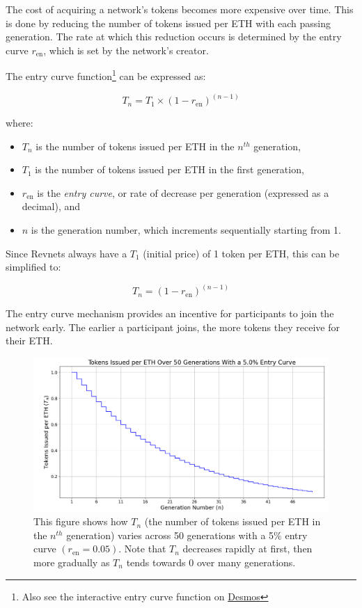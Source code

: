 \documentclass{article}
\begin{document}
The cost of acquiring a network's tokens becomes more expensive over time. This is done by reducing the number of tokens issued per ETH with each passing generation. The rate at which this reduction occurs is determined by the entry curve $r_{\text{en}}$, which is set by the network's creator.

The entry curve function\footnote{Also see the interactive entry curve function on \href{https://www.desmos.com/calculator/ey9fhuslwe}{Desmos}} can be expressed as:

\begin{equation}
  T_n = T_1 \times (1 - r_{\text{en}})^{(n - 1)}
\end{equation}

where:
\begin{itemize}
  \item $T_n$ is the number of tokens issued per ETH in the $n^{th}$ generation,
  \item $T_1$ is the number of tokens issued per ETH in the first generation,
  \item $r_{\text{en}}$ is the \textit{entry curve}, or rate of decrease per generation (expressed as a decimal), and
  \item $n$ is the generation number, which increments sequentially starting from 1.
\end{itemize}

Since Revnets always have a $T_1$ (initial price) of 1 token per ETH, this can be simplified to:

\begin{equation}
  T_n = (1 - r_{\text{en}})^{(n - 1)}
\end{equation}

The entry curve mechanism provides an incentive for participants to join the network early. The earlier a participant joins, the more tokens they receive for their ETH.

\begin{figure}[h]
  \centering
  \includegraphics[width=\textwidth]{figures/single-entry-curve.png}
   \caption{This figure shows how $T_n$ (the number of tokens issued per ETH in the $n^{th}$ generation) varies across 50 generations with a 5\% entry curve $(r_{\text{en}} = 0.05)$. Note that $T_n$ decreases rapidly at first, then more gradually as $T_n$ tends towards 0 over many generations.}
\end{figure}
\end{document}
